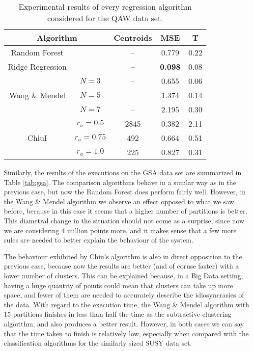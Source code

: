 \begin{table}[h!]
\centering
\caption{Experimental results of every regression algorithm considered for the QAW data set.}
\label{tab:qaw}
\begin{tabular}{ccccc}
\toprule
\multicolumn{2}{c}{Algorithm} & Centroids & MSE & T\\ \midrule
  Random Forest & & -- & 0.779 & 0.22 \\
  Ridge Regression & & -- & \textbf{0.098} &0.08\\
 \multirow{3}{*}{Wang \& Mendel} & $N=3$ & -- & 0.655 & 0.06\\
  & $N=5$ & -- & 1.374 & 0.14\\
  & $N=7$ & -- & 2.195 & 0.30\\
 \multirow{3}{*}{ChiuI} & $r_a=0.5$ &  2845 & 0.382 & 2.11\\
  & $r_a=0.75$ &  492 & 0.664 & 0.51\\
  & $r_a=1.0$ &  225 & 0.827 & 0.31\\ \bottomrule
\end{tabular}
\end{table}

Similarly, the results of the executions on the GSA data set are summarized in Table \ref{tab:gsa}. The comparison algorithms behave in a similar way as in the previous case, but now the Random Forest does perform fairly well. However, in the Wang \& Mendel algorithm we observe an effect opposed to what we saw before, because in this case it seems that a higher number of partitions is better. This diametral change in the situation should not come as a surprise, since now we are considering 4 million points more, and it makes sense that a few more rules are needed to better explain the behaviour of the system.

The behaviour exhibited by Chiu's algorithm is also in direct opposition to the previous case, because now the results are better (and of coruse faster) with a lower number of clusters. This can be explained because, in a Big Data setting, having a huge quantity of points could mean that clusters can take up more space, and fewer of them are needed to accurately describe the idiosyncrasies of the data. With regard to the execution time, the Wang \& Mendel algorithm with 15 partitions finishes in less than half the time as the subtractive clustering algorithm, and also produces a better result. However, in both cases we can say that the time taken to finish is relatively low, especially when compared with the classification algorithms for the similarly sized SUSY data set.

